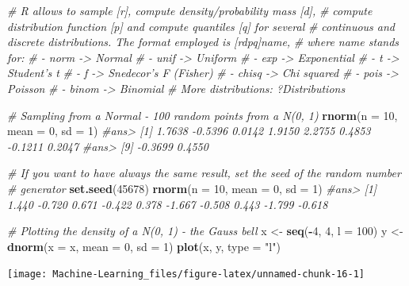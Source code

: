 \documentclass[]{book}
\newenvironment{Shaded}{\begin{snugshade}}{\end{snugshade}}
\newcommand{\KeywordTok}[1]{\textcolor[rgb]{0.13,0.29,0.53}{\textbf{#1}}}
\newcommand{\DataTypeTok}[1]{\textcolor[rgb]{0.13,0.29,0.53}{#1}}
\newcommand{\DecValTok}[1]{\textcolor[rgb]{0.00,0.00,0.81}{#1}}
\newcommand{\StringTok}[1]{\textcolor[rgb]{0.31,0.60,0.02}{#1}}
\newcommand{\CommentTok}[1]{\textcolor[rgb]{0.56,0.35,0.01}{\textit{#1}}}
\newcommand{\OperatorTok}[1]{\textcolor[rgb]{0.81,0.36,0.00}{\textbf{#1}}}
\newcommand{\NormalTok}[1]{#1}
\begin{document}
\begin{Shaded}
\begin{Highlighting}[]
\CommentTok{# R allows to sample [r], compute density/probability mass [d],}
\CommentTok{# compute distribution function [p] and compute quantiles [q] for several}
\CommentTok{# continuous and discrete distributions. The format employed is [rdpq]name,}
\CommentTok{# where name stands for:}
\CommentTok{# - norm -> Normal}
\CommentTok{# - unif -> Uniform}
\CommentTok{# - exp -> Exponential}
\CommentTok{# - t -> Student's t}
\CommentTok{# - f -> Snedecor's F (Fisher)}
\CommentTok{# - chisq -> Chi squared}
\CommentTok{# - pois -> Poisson}
\CommentTok{# - binom -> Binomial}
\CommentTok{# More distributions: ?Distributions}


\CommentTok{# Sampling from a Normal - 100 random points from a N(0, 1)}
\KeywordTok{rnorm}\NormalTok{(}\DataTypeTok{n =} \DecValTok{10}\NormalTok{, }\DataTypeTok{mean =} \DecValTok{0}\NormalTok{, }\DataTypeTok{sd =} \DecValTok{1}\NormalTok{)}
\CommentTok{#ans>  [1]  1.7638 -0.5396  0.0142  1.9150  2.2755  0.4853 -0.1211  0.2047}
\CommentTok{#ans>  [9] -0.3699  0.4550}

\CommentTok{# If you want to have always the same result, set the seed of the random number}
\CommentTok{# generator}
\KeywordTok{set.seed}\NormalTok{(}\DecValTok{45678}\NormalTok{)}
\KeywordTok{rnorm}\NormalTok{(}\DataTypeTok{n =} \DecValTok{10}\NormalTok{, }\DataTypeTok{mean =} \DecValTok{0}\NormalTok{, }\DataTypeTok{sd =} \DecValTok{1}\NormalTok{)}
\CommentTok{#ans>  [1]  1.440 -0.720  0.671 -0.422  0.378 -1.667 -0.508  0.443 -1.799 -0.618}

\CommentTok{# Plotting the density of a N(0, 1) - the Gauss bell}
\NormalTok{x <-}\StringTok{ }\KeywordTok{seq}\NormalTok{(}\OperatorTok{-}\DecValTok{4}\NormalTok{, }\DecValTok{4}\NormalTok{, }\DataTypeTok{l =} \DecValTok{100}\NormalTok{)}
\NormalTok{y <-}\StringTok{ }\KeywordTok{dnorm}\NormalTok{(}\DataTypeTok{x =}\NormalTok{ x, }\DataTypeTok{mean =} \DecValTok{0}\NormalTok{, }\DataTypeTok{sd =} \DecValTok{1}\NormalTok{)}
\KeywordTok{plot}\NormalTok{(x, y, }\DataTypeTok{type =} \StringTok{"l"}\NormalTok{)}
\end{Highlighting}
\end{Shaded}

\begin{center}\texttt{[image: Machine-Learning\_files/figure-latex/unnamed-chunk-16-1]} \end{center}
\end{document}
